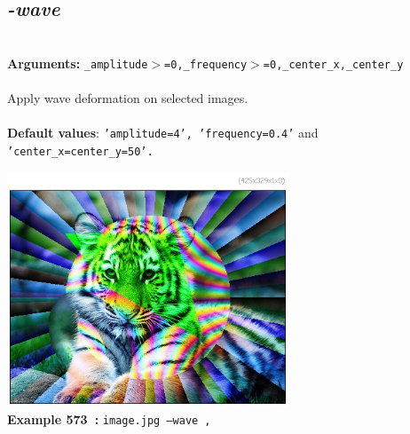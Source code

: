 \documentclass[a4paper,11pt,twoside]{book}
\begin{document}
\subsection{\emph{-wave} }\vspace*{-0.5em}
~\\\textbf{Arguments: } 
{\small \texttt{\_amplitude$>$=0,\_frequency$>$=0,\_center\_x,\_center\_y}}\\~\\
Apply wave deformation on selected images.
~\\~\\\textbf{Default values}: {\small \texttt{'amplitude=4', 'frequency=0.4'} and \texttt{'center\_x=center\_y=50'.}}
\begin{center}\includegraphics[keepaspectratio=true,height=7cm,width=\textwidth]{img/gmic_def573.jpg}\\
{\footnotesize \textbf{Example 573~:} \texttt{image.jpg --wave ,}}
\end{center}
\end{document}
